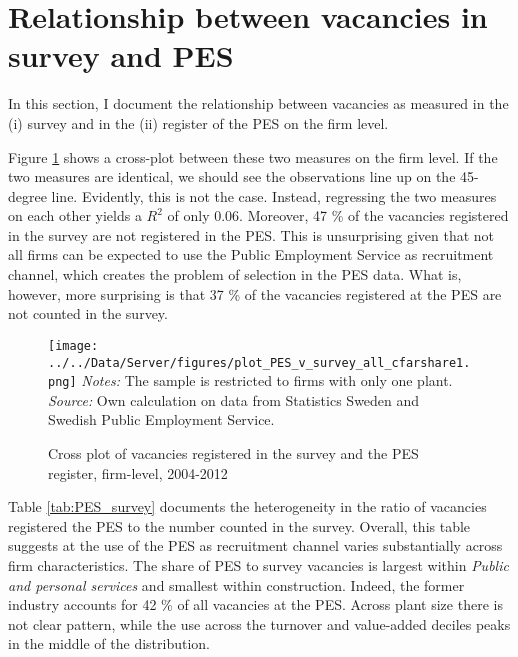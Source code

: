 \section{Relationship between vacancies in survey and PES}
\label{sec:PES_survey_rel} 

In this section, I document the relationship between vacancies as measured in the (i) survey and in the (ii) register of the PES on the firm level.

Figure \ref{fig:agg_PES_survey_share} shows a cross-plot between these two measures on the firm level. If the two measures are identical, we should see the observations line up on the 45-degree line. Evidently, this is not the case. Instead, regressing the two measures on each other yields a $R^2$ of only 0.06. Moreover, 47 \% of the vacancies registered in the survey are not registered in the PES. This is unsurprising given that not all firms can be expected to use the Public Employment Service as recruitment channel, which creates the problem of selection in the PES data. What is, however, more surprising is that 37 \% of the vacancies registered at the PES are not counted in the survey.

\begin{figure}[h]
\centering
\caption{Cross plot of vacancies registered in the survey and the PES register, firm-level, 2004-2012 }
\texttt{[image: ../../Data/Server/figures/plot\_PES\_v\_survey\_all\_cfarshare1.png]}
\flushleft
\footnotesize{\emph{Notes:} The sample is restricted to firms with only one plant.} \\
\footnotesize{\emph{Source:} Own calculation on data from Statistics Sweden and Swedish Public Employment Service.}
\label{fig:agg_PES_survey_share}
\end{figure}

Table \ref{tab:PES_survey} documents the heterogeneity in the ratio of vacancies registered the PES to the number counted in the survey. Overall, this table suggests at the use of the PES as recruitment channel varies substantially across firm characteristics. The share of PES to survey vacancies is largest within \emph{Public and personal services} and smallest within construction. Indeed, the former industry accounts for 42 \% of all vacancies at the PES. Across plant size there is not clear pattern, while the use across the turnover and value-added deciles peaks in the middle of the distribution. 



